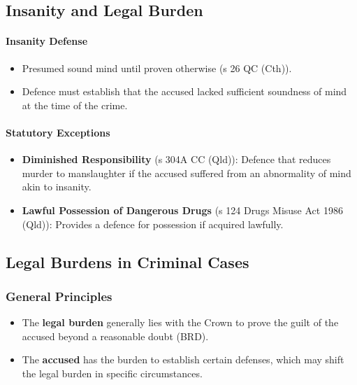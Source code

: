 \subsection{Insanity and Legal
Burden}\label{insanity-and-legal-burden}

\paragraph{Insanity Defense}\label{insanity-defense}

\begin{itemize}
\tightlist
\item
  Presumed sound mind until proven otherwise (s 26 QC (Cth)).
\item
  Defence must establish that the accused lacked sufficient soundness of
  mind at the time of the crime.
\end{itemize}

\paragraph{Statutory Exceptions}\label{statutory-exceptions}

\begin{itemize}
\tightlist
\item
  \textbf{Diminished Responsibility} (s 304A CC (Qld)): Defence that
  reduces murder to manslaughter if the accused suffered from an
  abnormality of mind akin to insanity.
\item
  \textbf{Lawful Possession of Dangerous Drugs} (s 124 Drugs Misuse Act
  1986 (Qld)): Provides a defence for possession if acquired lawfully.
\end{itemize}

\subsection{ Legal Burdens in Criminal
Cases}\label{legal-burdens-in-criminal-cases}

\subsubsection{General Principles}\label{general-principles}

\begin{itemize}
\tightlist
\item
  The \textbf{legal burden} generally lies with the Crown to prove the
  guilt of the accused beyond a reasonable doubt (BRD).
\item
  The \textbf{accused} has the burden to establish certain defenses,
  which may shift the legal burden in specific circumstances.
\end{itemize}

